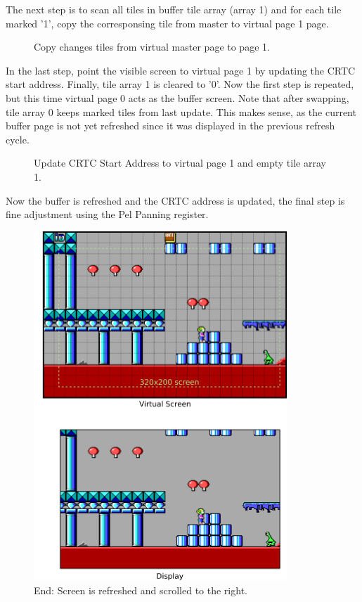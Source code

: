 \documentclass[book.tex]{subfiles}
\begin{document}
\pagebreak
The next step is to scan all tiles in buffer tile array (array 1) and for each tile marked '1', copy the corresponsing tile from master to virtual page 1 page.\\
\begin{figure}[H]
\centering
 \caption{Copy changes tiles from virtual master page to page 1.}
 \label{fig:kc1_3_step2}
\end{figure}


\pagebreak
In the last step, point the visible screen to virtual page 1 by updating the CRTC start address. Finally, tile array 1 is cleared to '0'. Now the first step is repeated, but this time virtual page 0 acts as the buffer screen. Note that after swapping, tile array 0 keeps marked tiles from last update. This makes sense, as the current buffer page is not yet refreshed since it was displayed in the previous refresh cycle. 

\begin{figure}[H]
\centering
 \caption{Update CRTC Start Address to virtual page 1 and empty tile array 1.}
 \label{fig:kc1_3_step2}
\end{figure}

\pagebreak

Now the buffer is refreshed and the CRTC address is updated, the final step is fine adjustment using the Pel Panning register.
\begin{figure}[H]
\centering
 \includegraphics[width=0.85\textwidth]{screenshots_300dpi/game/Keen_ATR_1-3_b.png}
 \caption{End: Screen is refreshed and scrolled to the right.}
 \label{fig:kc1_3_start}
\end{figure}
\end{document}
